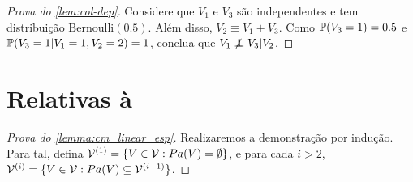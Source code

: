 \begin{proof}[Prova do \cref{lem:col-dep}]
 Considere que $V_1$ e $V_3$ são
 independentes e tem distribuição $\text{Bernoulli}(0.5)$.
 Além disso, $V_2 \equiv V_1+V_3$.
 Como $\P(V_3 = 1) = 0.5$ e
 $\P(V_3=1|V_1=1,V_2=2) = 1$, conclua que
 $V_1 \not\ind V_3 | V_2$.
\end{proof}

\section{Relativas à }

\begin{proof}[Prova do \cref{lemma:cm_linear_esp}]
 Realizaremos a demonstração por indução.
 Para tal, defina 
 $\sV^{(1)} = \{V \in \sV: Pa(V) = \emptyset\}$, e
 para cada $i > 2$,
 $\sV^{(i)} = \{V \in \sV: Pa(V) \subseteq \sV^{(i-1)}\}$.
 

\end{proof}
